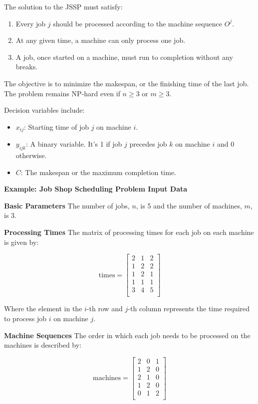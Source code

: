 {The solution to the JSSP must satisfy:

\begin{enumerate}
  \item Every job \( j \) should be processed according to the machine sequence \( O^j \).
  \item At any given time, a machine can only process one job.
  \item A job, once started on a machine, must run to completion without any breaks.
\end{enumerate}

The objective is to minimize the makespan, or the finishing time of the last job. The problem remains NP-hard even if \( n \geq 3 \) or \( m \geq 3 \).

Decision variables include:
\begin{itemize}
  \item \( x_{i j} \): Starting time of job \( j \) on machine \( i \).
  \item \( y_{i j k} \): A binary variable. It's 1 if job \( j \) precedes job \( k \) on machine \( i \) and 0 otherwise.
  \item \( C \): The makespan or the maximum completion time.
\end{itemize}



\textbf{Example: Job Shop Scheduling Problem Input Data}

\textbf{Basic Parameters}
The number of jobs, \( n \), is 5 and the number of machines, \( m \), is 3. 

\textbf{Processing Times}
The matrix of processing times for each job on each machine is given by:

\[
\text{times} = 
\begin{bmatrix}
2 & 1 & 2 \\
1 & 2 & 2 \\
1 & 2 & 1 \\
1 & 1 & 1 \\
3 & 4 & 5 \\
\end{bmatrix}
\]

Where the element in the \(i\)-th row and \(j\)-th column represents the time required to process job \(i\) on machine \(j\).

\textbf{Machine Sequences}
The order in which each job needs to be processed on the machines is described by:

\[
\text{machines} = 
\begin{bmatrix}
2 & 0 & 1 \\
1 & 2 & 0 \\
2 & 1 & 0 \\
1 & 2 & 0 \\
0 & 1 & 2 \\
\end{bmatrix}
\]

}
